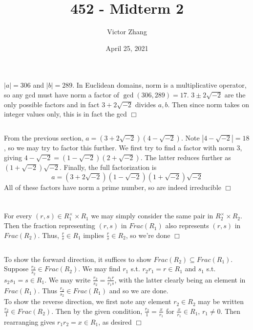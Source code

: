 \documentclass{article}
\title{452 - Midterm 2}
\author{Victor Zhang}
\date{April 25, 2021}
\begin{document}
\maketitle

\section{}
\subsection{}
$|a| = 306$ and $|b| = 289$. In Euclidean domains, norm is a multiplicative operator, so any gcd must have norm a factor of $\gcd(306,289) = 17$. $3 \pm 2\sqrt{-2}$ are the only possible factors and in fact $3 + 2\sqrt{-2}$ divides $a,b$. Then since norm takes on integer values only, this is in fact the gcd $\Box$
\subsection{}
From the previous section, $a = (3 + 2\sqrt{-2})(4 - \sqrt{-2})$. Note $|4 - \sqrt{-2}| = 18$, so we may try to factor this further. We first try to find a factor with norm 3, giving $4 - \sqrt{-2} = (1 - \sqrt{-2})(2 + \sqrt{-2})$. The latter reduces further as $(1+\sqrt{-2})\sqrt{-2}$. Finally, the full factorization is
$$a = (3 + 2\sqrt{-2})(1 - \sqrt{-2})(1+\sqrt{-2})\sqrt{-2}$$
All of these factors have norm a prime number, so are indeed irreducible $\Box$

\section{}
\subsection{}
For every $(r,s) \in R_1^\times \times R_1$ we may simply consider the same pair in $R_2^\times \times R_2$. Then the fraction representing $(r,s)$ in $Frac(R_1)$ also represents $(r,s)$ in $Frac(R_2)$. Thus, $\frac{r}{s} \in R_1$ implies $\frac{r}{s} \in R_2$, so we're done $\Box$

\subsection{}
To show the forward direction, it suffices to show $Frac(R_2) \subseteq Frac(R_1)$. Suppose $\frac{r_2}{s_2} \in Frac(R_2)$. We may find $r_1$ s.t. $r_2r_1 = r \in R_1$ and $s_1$ s.t. $s_2s_1 = s \in R_1$. We may write $\frac{r_2}{s_2} = \frac{s_1r}{r_1s}$, with the latter clearly being an element in $Frac(R_1)$. Thus $\frac{r_2}{s_2} \in Frac(R_1)$ and so we are done.\\
To show the reverse direction, we first note any element $r_2 \in R_2$ may be written $\frac{r_2}{1} \in Frac(R_2)$. Then by the given condition, $\frac{r_2}{1} = \frac{x}{r_1}$ for $\frac{x}{r_1} \in R_1$, $r_1 \neq 0$. Then rearranging gives $r_1r_2 = x \in R_1$, as desired $\Box$
\end{document}
